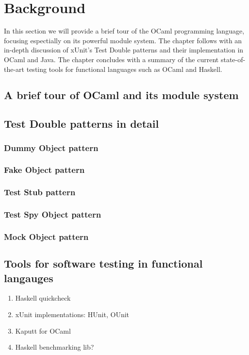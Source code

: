\chapter{Background}
\label{background}

In this section we will provide a brief tour of the OCaml programming
language, focusing espectially on its powerful module system. The
chapter follows with an in-depth discussion of xUnit's Test Double
patterns and their implementation in OCaml and Java. The chapter
concludes with a summary of the current state-of-the-art testing tools
for functional languages such as OCaml and Haskell.

\section{A brief tour of OCaml and its module system}
\label{ocaml}


\section{Test Double patterns in detail}
\label{testdoubles}

\subsection{Dummy Object pattern}
\label{testdoubles:dummy}

\subsection{Fake Object pattern}
\label{testdoubles:fake}

\subsection{Test Stub pattern}
\label{testdoubles:stub}

\subsection{Test Spy Object pattern}
\label{testdoubles:spy}

\subsection{Mock Object pattern}
\label{testdoubles:mocks}

\section{Tools for software testing in functional langauges}
\label{testtools}

\begin{enumerate}
\item Haskell quickcheck
\item xUnit implementations: HUnit, OUnit
\item Kaputt for OCaml
\item Haskell benchmarking lib?
\end{enumerate}
